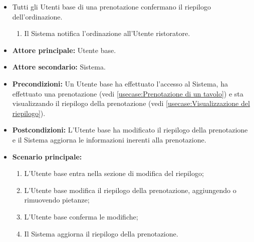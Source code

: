 \begin{itemize}
\begin{itemize}
		      \item Tutti gli Utenti base di una prenotazione confermano il
		            riepilogo dell'ordinazione.
		            \begin{enumerate}
			            \item Il Sistema notifica l'ordinazione all'Utente ristoratore.
		            \end{enumerate}
	      \end{itemize}
\end{itemize}


\label{usecase:Aggiornamento del riepilogo}
\begin{itemize}
	\item \textbf{Attore principale:} Utente base.

	\item \textbf{Attore secondario:} Sistema.

	\item \textbf{Precondizioni:}
	      Un Utente base ha effettuato l'accesso al Sistema, ha effettuato una
	      prenotazione (vedi \autoref{usecase:Prenotazione di un tavolo}) e
	      sta visualizzando il riepilogo della prenotazione
	      (vedi \autoref{usecase:Visualizzazione del riepilogo}).

	\item \textbf{Postcondizioni:}
	      L'Utente base ha modificato il riepilogo della prenotazione e il Sistema
	      aggiorna le informazioni inerenti alla prenotazione.

	\item \textbf{Scenario principale:}
	      \begin{enumerate}
		      \item L'Utente base entra nella sezione di modifica del riepilogo;
		      \item L'Utente base modifica il riepilogo della prenotazione, aggiungendo o
		            rimuovendo pietanze;
		      \item L'Utente base conferma le modifiche;
		      \item Il Sistema aggiorna il riepilogo della prenotazione.
	      \end{enumerate}
\end{itemize}
